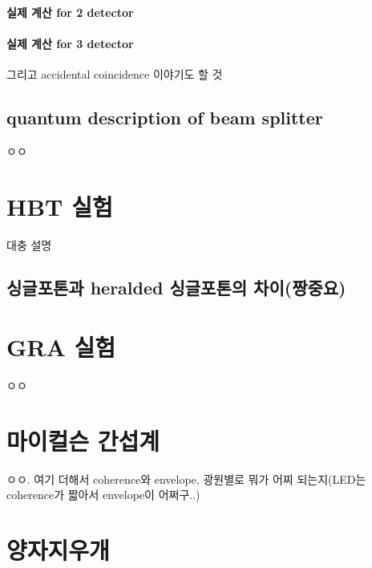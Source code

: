 \paragraph{실제 계산 for 2 detector}
\paragraph{실제 계산 for 3 detector}
그리고 accidental coincidence 이야기도 할 것
\subsection{quantum description of beam splitter}
ㅇㅇ


\section{HBT 실험}
대충 설명
\subsection{싱글포톤과 heralded 싱글포톤의 차이(짱중요)}

\section{GRA 실험}
ㅇㅇ

\section{마이컬슨 간섭계}
ㅇㅇ. 여기 더해서 coherence와 envelope, 광원별로 뭐가 어찌 되는지(LED는 coherence가 짧아서 envelope이 어쩌구..)

\section{양자지우개}